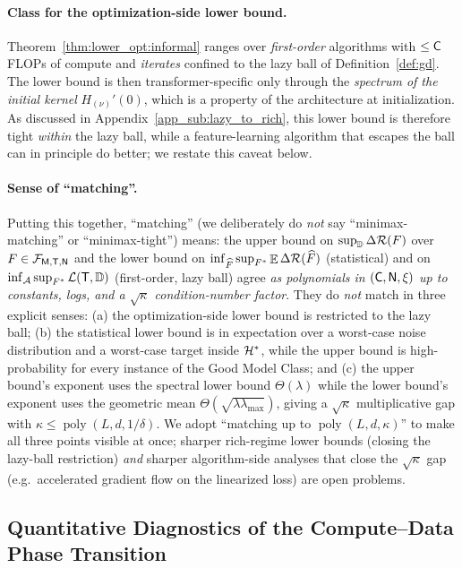 \documentclass[11pt]{article}
\theoremstyle{plain}
\newcommand{\wh}{\widehat}
\renewcommand{\hat}{\wh}
\DeclareMathOperator*{\E}{{\mathbb{E}}}
\DeclareMathOperator{\poly}{poly}
\begin{document}
\paragraph{Class for the optimization-side lower bound.}
Theorem~\ref{thm:lower_opt:informal} ranges over {\it first-order} algorithms with $\le {\sf C}$ FLOPs of compute and {\it iterates} confined to the lazy ball of Definition~\ref{def:gd}. The lower bound is then transformer-specific only through the {\it spectrum of the initial kernel} $H_{(\nu)}'(0)$, which is a property of the architecture at initialization. As discussed in Appendix~\ref{app_sub:lazy_to_rich}, this lower bound is therefore tight {\it within} the lazy ball, while a feature-learning algorithm that escapes the ball can in principle do better; we restate this caveat below.

\paragraph{Sense of ``matching''.}
Putting this together, ``matching'' (we deliberately do {\it not} say ``minimax-matching'' or ``minimax-tight'') means: the upper bound on $\sup_{\mathbb{D}}\Delta{\cal R}(F)$ over $F\in{\cal F}_{{\sf M},{\sf T},{\sf N}}$ and the lower bound on $\inf_{\hat F}\sup_{F^*}\E\Delta{\cal R}(\hat F)$ (statistical) and on $\inf_{\cal A}\sup_{F^*}{\cal L}({\sf T},\mathbb{D})$ (first-order, lazy ball) agree {\it as polynomials in $({\sf C},{\sf N},\xi)$ up to constants, logs, and a $\sqrt{\kappa}$ condition-number factor}. They do {\it not} match in three explicit senses: (a) the optimization-side lower bound is restricted to the lazy ball; (b) the statistical lower bound is in expectation over a worst-case noise distribution and a worst-case target inside ${\cal H}^*$, while the upper bound is high-probability for every instance of the Good Model Class; and (c) the upper bound's exponent uses the spectral lower bound $\Theta(\lambda)$ while the lower bound's exponent uses the geometric mean $\Theta(\sqrt{\lambda\lambda_{\max}})$, giving a $\sqrt{\kappa}$ multiplicative gap with $\kappa\le\poly(L,d,1/\delta)$. We adopt ``matching up to $\poly(L,d,\kappa)$'' to make all three points visible at once; sharper rich-regime lower bounds (closing the lazy-ball restriction) {\it and} sharper algorithm-side analyses that close the $\sqrt{\kappa}$ gap (e.g.~accelerated gradient flow on the linearized loss) are open problems.

\subsection{Quantitative Diagnostics of the Compute--Data Phase Transition}\label{app_sub:phase_diagnostics}
\end{document}
